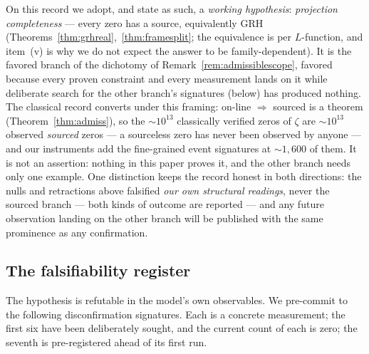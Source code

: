 \documentclass[11pt]{article}
\begin{document}
On this record we adopt, and state as such, a \emph{working hypothesis}: \emph{projection
completeness} --- every zero has a source, equivalently GRH
(Theorems~\ref{thm:grhreal},~\ref{thm:framesplit}; the equivalence is per $L$-function,
and item~(v) is why we do not expect the answer to be family-dependent).  It is the favored
branch of the dichotomy of Remark~\ref{rem:admissiblescope}, favored because every proven
constraint and every measurement lands on it while deliberate search for the other branch's
signatures (below) has produced nothing.  The classical record converts under this framing:
on-line $\Rightarrow$ sourced is a theorem (Theorem~\ref{thm:admiss}), so the ${\sim}10^{13}$
classically verified zeros of $\zeta$ are ${\sim}10^{13}$ observed \emph{sourced} zeros --- a
sourceless zero has never been observed by anyone --- and our instruments add the fine-grained
event signatures at ${\sim}1{,}600$ of them.  It is not an assertion: nothing in this paper
proves it, and the other branch needs only one example.  One distinction keeps the record
honest in both directions: the nulls and retractions above falsified \emph{our own
structural readings}, never the sourced branch --- both kinds of outcome are reported
--- and any future observation landing on the other branch will be published with the same
prominence as any confirmation.

\subsection{The falsifiability register}\label{sub:falsify}

The hypothesis is refutable in the model's own observables.  We pre-commit to the following
disconfirmation signatures.  Each is a concrete measurement; the first six have been
deliberately sought, and the current count of each is zero; the seventh is pre-registered
ahead of its first run.
\end{document}
